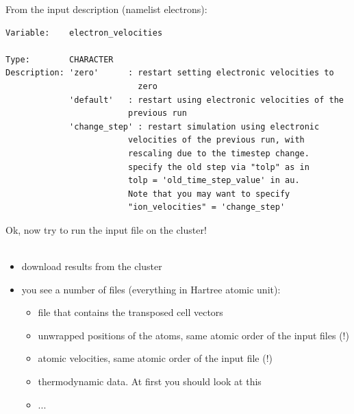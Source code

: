 \documentclass[landscape]{foils}
\begin{document}
From the  input description (namelist electrons):
\begin{verbatim}
Variable:    electron_velocities

Type:        CHARACTER
Description: 'zero'      : restart setting electronic velocities to
                           zero
             'default'   : restart using electronic velocities of the
                         previous run
             'change_step' : restart simulation using electronic
                         velocities of the previous run, with
                         rescaling due to the timestep change.
                         specify the old step via "tolp" as in
                         tolp = 'old_time_step_value' in au.
                         Note that you may want to specify
                         "ion_velocities" = 'change_step'
\end{verbatim}

Ok, now try to run the input file on the cluster!\\
\\



\begin{itemize}
  \item download results from the cluster
  \item you see a number of files (everything in Hartree atomic unit):
	  \begin{itemize}
		  \item {} file that contains the transposed cell vectors
		  \item {} unwrapped positions of the atoms, same atomic order of the input files (!)
		  \item {} atomic velocities, same atomic order of the input file (!)
		  \item {} thermodynamic data. At first you should look at this
		  \item ...
	  \end{itemize}
\end{itemize}
\end{document}
